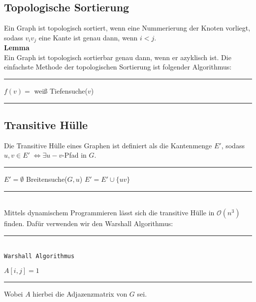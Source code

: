 \documentclass[a4paper, 12pt]{article}
\begin{document}
	\subsection{Topologische Sortierung}
	Ein Graph ist topologisch sortiert, wenn eine Nummerierung der Knoten vorliegt, sodass $v_iv_j$ eine Kante ist genau dann, wenn $i<j$.\\
	\textbf{Lemma}\\
	Ein Graph ist topologisch sortierbar genau dann, wenn er azyklisch ist. Die einfachste Methode der topologischen Sortierung ist folgender Algorithmus:
	\par\noindent\rule{\textwidth}{0.4pt}
	\begin{algorithmic}[1]
		\State $f(v) =$ weiß
		\EndFor
		Tiefensuche($v$)
		\EndIf
		\EndFor
	\end{algorithmic}
	\par\noindent\rule{\textwidth}{0.4pt}
	\subsection{Transitive Hülle}
	Die Transitive Hülle eines Graphen ist definiert als die Kantenmenge $E'$, sodass $u,v \in E' \; \Leftrightarrow \exists u-v$-Pfad in $G$.
	\par\noindent\rule{\textwidth}{0.4pt}
	\begin{algorithmic}[1]
		\State $E' = \emptyset$
		\State Breitensuche($G, u$)
		\State $E' = E' \cup \{uv\}$
		\EndIf
		\EndFor
		\EndFor
	\end{algorithmic}
	\par\noindent\rule{\textwidth}{0.4pt}\\
	Mittels dynamischem Programmieren lässt sich die transitive Hülle in $\mathcal{O}(n^3)$ finden. Dafür verwenden wir den Warshall Algorithmus:
	\par\noindent\rule{\textwidth}{0.4pt}\\
	\texttt{Warshall Algorithmus}
	\begin{algorithmic}[1]
		\State $A[i,j] = 1$
		\EndIf
		\EndFor
		\EndIf
		\EndFor
		\EndFor
	\end{algorithmic}
	\par\noindent\rule{\textwidth}{0.4pt}
	Wobei $A$ hierbei die Adjazenzmatrix von $G$ sei.
\end{document}
